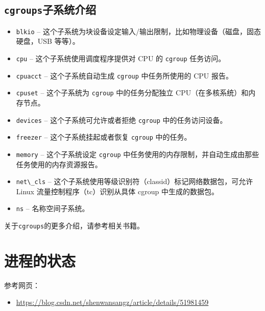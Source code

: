 \documentclass[doctor,openright,twoside]{sjtuthesis}
\providecommand{\tightlist}{%
    \setlength{\itemsep}{0pt}\setlength{\parskip}{0pt}}
\newcommand{\passthrough}[1]{#1}
\theoremstyle{plain}
\theoremstyle{definition}
\theoremstyle{remark}
\theoremstyle{ocrenumbox}
\theoremstyle{plain}
\begin{document}
\hypertarget{cgroups}{%
\subsection{\texorpdfstring{\texttt{cgroups}子系统介绍}{cgroups子系统介绍}}\label{cgroups}}

\begin{itemize}
\tightlist
\item
  \passthrough{\lstinline!blkio!} --
  这个子系统为块设备设定输入/输出限制，比如物理设备（磁盘，固态硬盘，USB
  等等）。
\item
  \passthrough{\lstinline!cpu!} -- 这个子系统使用调度程序提供对 CPU 的
  \passthrough{\lstinline!cgroup!} 任务访问。
\item
  \passthrough{\lstinline!cpuacct!} -- 这个子系统自动生成
  \passthrough{\lstinline!cgroup!} 中任务所使用的 CPU 报告。
\item
  \passthrough{\lstinline!cpuset!} -- 这个子系统为
  \passthrough{\lstinline!cgroup!} 中的任务分配独立
  CPU（在多核系统）和内存节点。
\item
  \passthrough{\lstinline!devices!} -- 这个子系统可允许或者拒绝
  \passthrough{\lstinline!cgroup!} 中的任务访问设备。
\item
  \passthrough{\lstinline!freezer!} -- 这个子系统挂起或者恢复
  \passthrough{\lstinline!cgroup!} 中的任务。
\item
  \passthrough{\lstinline!memory!} -- 这个子系统设定
  \passthrough{\lstinline!cgroup!}
  中任务使用的内存限制，并自动生成由那些任务使用的内存资源报告。
\item
  \passthrough{\lstinline!net\_cls!} --
  这个子系统使用等级识别符（classid）标记网络数据包，可允许 Linux
  流量控制程序（tc）识别从具体 cgroup 中生成的数据包。
\item
  \passthrough{\lstinline!ns!} -- 名称空间子系统。
\end{itemize}

关于\passthrough{\lstinline!cgroups!}的更多介绍，请参考相关书籍。

\section{进程的状态}

参考网页：

\begin{itemize}
\tightlist
\item
  \url{https://blog.csdn.net/shenwansangz/article/details/51981459}
\end{itemize}
\end{document}
